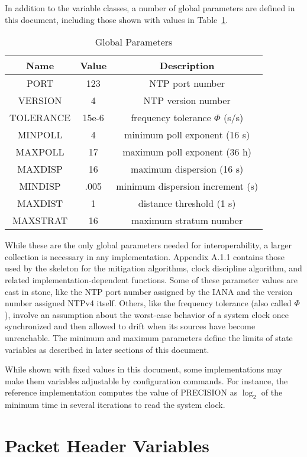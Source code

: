 In addition to the variable classes, a number of global parameters
are defined in this document, including those shown with values in
Table~\ref{global_parameters}.

\begin{table}[htb]
\center
\begin{tabular}{c | c | c}
Name & Value & Description \\
\hline
\hline
PORT & 123 & NTP port number \\
VERSION & 4 & NTP version number \\
TOLERANCE & 15e-6 & frequency tolerance $ \Phi $ (s/s) \\
MINPOLL & 4 & minimum poll exponent (16 s) \\
MAXPOLL & 17 & maximum poll exponent (36 h) \\
MAXDISP & 16 & maximum dispersion (16 s) \\
MINDISP & .005 & minimum dispersion increment (s) \\
MAXDIST & 1 & distance threshold (1 s) \\
MAXSTRAT & 16 & maximum stratum number \\
\hline
\end{tabular}
\label{global_parameters}
\caption{Global Parameters}
\end{table}

While these are the only global parameters needed for
interoperability, a larger collection is necessary in any
implementation. Appendix A.1.1 contains those used by the skeleton
for the mitigation algorithms, clock discipline algorithm, and
related implementation-dependent functions. Some of these parameter
values are cast in stone, like the NTP port number assigned by the
IANA and the version number assigned NTPv4 itself. Others, like the
frequency tolerance (also called $ \Phi $), involve an assumption about
the worst-case behavior of a system clock once synchronized and then
allowed to drift when its sources have become unreachable. The
minimum and maximum parameters define the limits of state variables
as described in later sections of this document.

While shown with fixed values in this document, some implementations
may make them variables adjustable by configuration commands. For
instance, the reference implementation computes the value of
PRECISION as $ \log_2 $ of the minimum time in several iterations to read
the system clock.

\section{Packet Header Variables}
\label{section-7-3}

